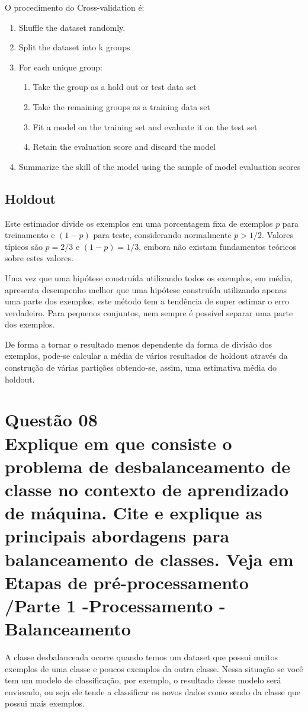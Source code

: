 \documentclass[12pt]{article}
\begin{document}
O procedimento do Cross-validation é:
\begin{enumerate}
    \item Shuffle the dataset randomly.
    \item Split the dataset into k groups
    \item For each unique group:
    \begin{enumerate}
        \item Take the group as a hold out or test data set
        \item Take the remaining groups as a training data set
        \item Fit a model on the training set and evaluate it on the test set
        \item Retain the evaluation score and discard the model
    \end{enumerate}
    \item Summarize the skill of the model using the sample of model evaluation scores
\end{enumerate}
\subsection{Holdout}
Este estimador divide os exemplos em uma porcentagem fixa de exemplos $p$ para treinamento e $(1-p)$ para teste, considerando normalmente $p > 1/2$.
Valores típicos são $p = 2/3$ e $(1-p) = 1/3$, embora não existam fundamentos teóricos sobre estes valores.

Uma vez que uma hipótese construída utilizando todos os exemplos, em média, apresenta desempenho melhor que uma hipótese construída utilizando apenas uma parte dos exemplos, este método tem a tendência de super estimar o erro verdadeiro.
Para pequenos conjuntos, nem sempre é possível separar uma parte dos exemplos.

De forma a tornar o resultado menos dependente da forma de divisão dos exemplos, pode-se calcular a média de vários resultados de holdout através da construção de várias partições obtendo-se, assim, uma estimativa média do holdout.

\section{Questão 08\\
Explique em que consiste o problema de desbalanceamento de classe no contexto de aprendizado de máquina.
Cite e explique as principais abordagens para balanceamento de classes.
Veja em Etapas de pré-processamento /Parte 1 -Processamento -Balanceamento
}
A classe desbalanceada ocorre quando temos um dataset que possui muitos exemplos de uma classe e poucos exemplos da outra classe.
Nessa situação se você tem um modelo de classificação, por exemplo, o resultado desse modelo será enviesado, ou seja ele tende a classificar os novos dados como sendo da classe que possui mais exemplos.
\end{document}
